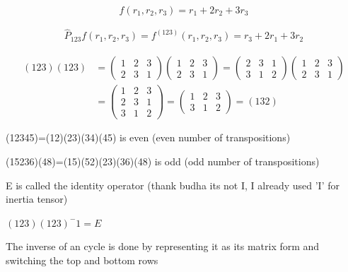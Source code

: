\documentclass[11pt,a4paper]{book}
\begin{document}
			\begin{equation}
			f(r_1,r_2,r_3)=r_1 + 2r_2 + 3r_3
			\end{equation}
			
			\begin{equation}
			\begin{split}
			\hat{P}_{123}f(r_1, r_2, r_3) = f^{(123)}(r_1, r_2, r_3) =r_3 + 2 r_1  + 3 r_2
			\end{split}
			\end{equation}
			
			\begin{equation}
			\begin{split}
			(123)(123)&=
			\begin{pmatrix}
			1 & 2 & 3 \\
			2 & 3 & 1
			\end{pmatrix} 
			\begin{pmatrix}
			1 & 2 & 3 \\
			2 & 3 & 1
			\end{pmatrix} 
			=
			\begin{pmatrix}
			2 & 3 & 1 \\
			3 & 1 & 2
			\end{pmatrix} 
			\begin{pmatrix}
			1 & 2 & 3 \\
			2 & 3 & 1
			\end{pmatrix} \\
			&=
			\begin{pmatrix}
			1 & 2 & 3 \\
			2 & 3 & 1 \\
			3 & 1 & 2 
			\end{pmatrix} 	
			=	
			\begin{pmatrix}
			1 & 2 & 3 \\
			3 & 1 & 2 
			\end{pmatrix}
			=
			(132)
			\end{split}
			\end{equation}
			
			(12345)=(12)(23)(34)(45) is even (even number of transpositions)
			
			(15236)(48)=(15)(52)(23)(36)(48) is odd (odd number of transpositions)
			
			E is called the identity operator (thank budha its not I, I already used 'I' for inertia tensor)
			
			$(123)(123)^-1 = E$
			
			The inverse of an cycle is done by representing it as its matrix form and switching the top and bottom rows
			
\end{document}
